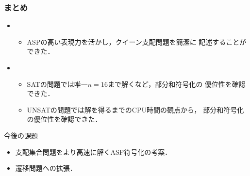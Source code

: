 \documentclass[dvipdfmx,10pt]{beamer}
\begin{document}
%
%

\begin{frame}\frametitle{まとめ}
  \begin{itemize}
   \item {}
	 \begin{itemize}
	  \item ASPの高い表現力を活かし，クイーン支配問題を簡潔に
		記述することができた．
	 \end{itemize}
   \item {}
	 \begin{itemize}
	  \item SATの問題では唯一$n=16$まで解くなど，部分和符号化の
		優位性を確認できた．
	  \item UNSATの問題では解を得るまでのCPU時間の観点から，
		部分和符号化の優位性を確認できた．
	 \end{itemize}
  \end{itemize}
 \begin{alertblock}{今後の課題}
  \begin{itemize}
   \item 支配集合問題をより高速に解くASP符号化の考案．
   \item 遷移問題への拡張．
  \end{itemize}
 \end{alertblock}
\end{frame}

%
%


\end{document}
